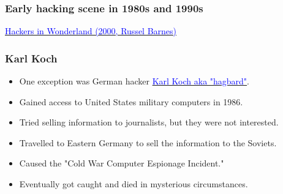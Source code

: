\documentclass[aspectratio=169,usenames,dvipsnames]{beamer}
\begin{document}
\begin{frame}
  \frametitle{Early hacking scene in 1980s and 1990s}

  \centering


  \footnotesize
  \href{https://www.youtube.com/watch?v=aSSqLLeGdHI&t=323}{\textcolor{blue}{Hackers in Wonderland  (2000, Russel Barnes)}}
\end{frame}

\begin{frame}
  \frametitle{Karl Koch}

  \begin{itemize}[<+->]
    \item One exception was German hacker
      \href{https://en.wikipedia.org/wiki/Karl_Koch_\%28hacker\%29}{\textcolor{blue}{Karl Koch
      aka "hagbard"}}.
    \item Gained access to United States military computers in 1986.
    \item Tried selling information to journalists, but they were not
      interested.
    \item Travelled to Eastern Germany to sell the information to the Soviets.
    \item Caused the "Cold War Computer Espionage Incident."
    \item Eventually got caught and died in mysterious circumstances.
  \end{itemize}

\end{frame}
\end{document}
